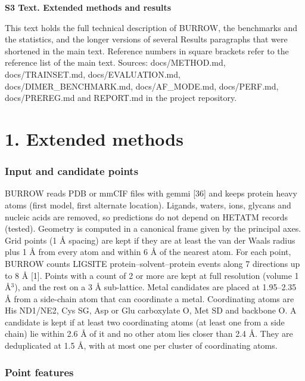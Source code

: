 \documentclass[10pt,letterpaper]{article}
\begin{document}
\begin{flushleft}
{\Large\textbf{S3 Text. Extended methods and results}}
\end{flushleft}
This text holds the full technical description of BURROW, the benchmarks and the statistics, and the longer versions of several Results paragraphs that were shortened in the main text. Reference numbers in square brackets refer to the reference list of the main text. Sources: docs/METHOD.md, docs/TRAINSET.md, docs/EVALUATION.md, docs/DIMER\_BENCHMARK.md, docs/AF\_MODE.md, docs/PERF.md, docs/PREREG.md and REPORT.md in the project repository.

\section*{1. Extended methods}

\subsubsection*{Input and candidate points}

BURROW reads PDB or mmCIF files with gemmi [36] and keeps protein heavy atoms (first model, first alternate location). Ligands, waters, ions, glycans and nucleic acids are removed, so predictions do not depend on HETATM records (tested). Geometry is computed in a canonical frame given by the principal axes. Grid points (1 \AA{} spacing) are kept if they are at least the van der Waals radius plus 1 \AA{} from every atom and within 6 \AA{} of the nearest atom. For each point, BURROW counts LIGSITE protein--solvent--protein events along 7 directions up to 8 \AA{} [1]. Points with a count of 2 or more are kept at full resolution (volume 1 \AA{}$^{3}$), and the rest on a 3 \AA{} sub-lattice. Metal candidates are placed at 1.95--2.35 \AA{} from a side-chain atom that can coordinate a metal. Coordinating atoms are His ND1/NE2, Cys SG, Asp or Glu carboxylate O, Met SD and backbone O. A candidate is kept if at least two coordinating atoms (at least one from a side chain) lie within 2.6 \AA{} of it and no other atom lies closer than 2.4 \AA{}. They are deduplicated at 1.5 \AA{}, with at most one per cluster of coordinating atoms.

\subsubsection*{Point features}
\end{document}
